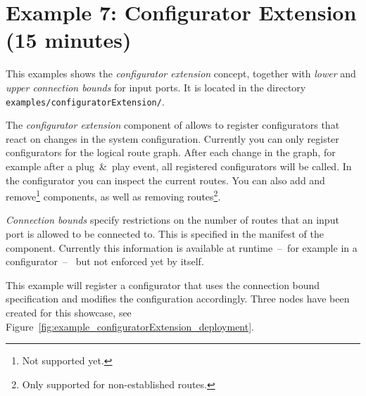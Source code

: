 %
% 
%
%
%

\section{Example 7: Configurator Extension (15 minutes)}
\label{sec:example_configuratorExtension}

This examples shows the \textit{configurator extension} concept,
together with \textit{lower} and \textit{upper connection bounds} for input ports.
It is located in the directory \texttt{examples/configuratorExtension/}. 

The \textit{configurator extension} component of \xme allows to register configurators
that react on changes in the system configuration. Currently you can only
register configurators for the logical route graph.
After each change in the graph, for example after a plug~\&~play event, all
registered configurators will be called.
In the configurator you can inspect the current routes.
You can also add and remove\footnote{Not supported yet.} components, as
well as removing routes\footnote{Only supported for non-established routes.}.

\textit{Connection bounds} specify restrictions on the number of routes that an input
port is allowed to be connected to.
This is specified in the manifest of the component.
Currently this information is available at runtime~--~for example in a configurator~--~
but not enforced yet by \xme itself.

This example will register a configurator that uses the connection bound specification
and modifies the configuration accordingly.
Three nodes have been created for this showcase, see Figure~\ref{fig:example_configuratorExtension_deployment}.

